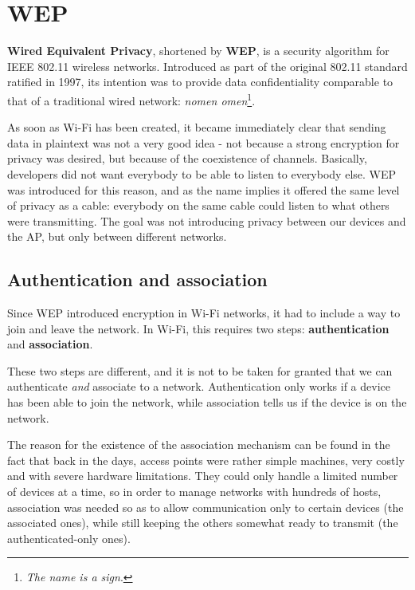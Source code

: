 
\section{WEP}
\textbf{Wired Equivalent Privacy}, shortened by \textbf{WEP}, is a security algorithm for IEEE 802.11 wireless networks. Introduced as part of the original 802.11 standard ratified in 1997, its intention was to provide data confidentiality comparable to that of a traditional wired network: \textit{nomen omen}\footnote{\textit{The name is a sign}.}.

As soon as Wi-Fi has been created, it became immediately clear that sending data in plaintext was not a very good idea - not because a strong encryption for privacy was desired, but because of the coexistence of channels. Basically, developers did not want everybody to be able to listen to everybody else. WEP was introduced for this reason, and as the name implies it offered the same level of privacy as a cable: everybody on the same cable could listen to what others were transmitting. The goal was not introducing privacy between our devices and the AP, but only between different networks.


\subsection{Authentication and association}
Since WEP introduced encryption in Wi-Fi networks, it had to include a way to join and leave the network. In Wi-Fi, this requires two steps: \textbf{authentication} and \textbf{association}.

These two steps are different, and it is not to be taken for granted that we can authenticate \textit{and} associate to a network. Authentication only works if a device has been able to join the network, while association tells us if the device is on the network.

The reason for the existence of the association mechanism can be found in the fact that back in the days, access points were rather simple machines, very costly and with severe hardware limitations. They could only handle a limited number of devices at a time, so in order to manage networks with hundreds of hosts, association was needed so as to allow communication only to certain devices (the associated ones), while still keeping the others somewhat ready to transmit (the authenticated-only ones).

